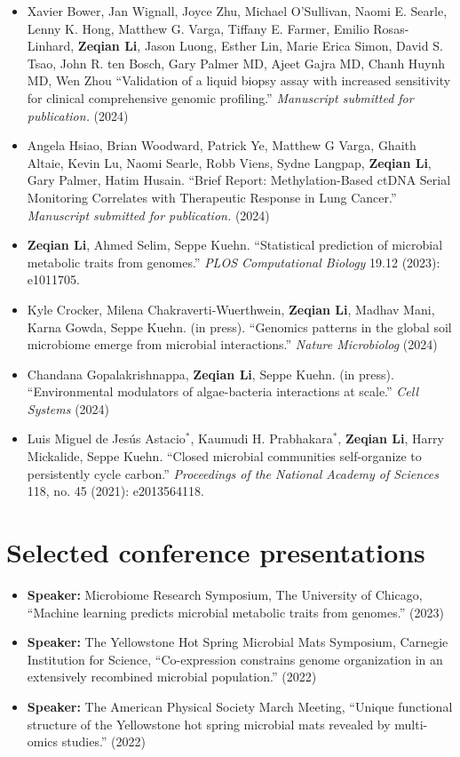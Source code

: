 \documentclass[letterpaper,11pt]{article}
\newcommand{\resumeSubHeadingListStart}{\begin{itemize}[leftmargin=0in]}
\newcommand{\resumeSubHeadingListEnd}{\end{itemize}}
\begin{document}
 \resumeSubHeadingListStart
     \item[] Xavier Bower, Jan Wignall, Joyce Zhu, Michael O’Sullivan, Naomi E. Searle, Lenny K. Hong, Matthew G. Varga, Tiffany E. Farmer, Emilio Rosas-Linhard, \textbf{Zeqian Li}, Jason Luong, Esther Lin, Marie Erica Simon, David S. Tsao, John R. ten Bosch, Gary Palmer MD, Ajeet Gajra MD, Chanh Huynh MD, Wen Zhou ``Validation of a liquid biopsy assay with increased sensitivity for clinical comprehensive genomic profiling.''  \textit{Manuscript submitted 
 for publication.} (2024)
     \item[] Angela Hsiao, Brian Woodward, Patrick Ye, Matthew G Varga, Ghaith Altaie, Kevin Lu, Naomi Searle, Robb Viens, Sydne Langpap, \textbf{Zeqian Li}, Gary Palmer, Hatim Husain. ``Brief Report: Methylation-Based ctDNA Serial Monitoring Correlates with Therapeutic Response in Lung Cancer.''  \textit{Manuscript submitted 
     for publication.} (2024)
     \item[] \textbf{Zeqian Li}, Ahmed Selim, Seppe Kuehn. ``Statistical prediction of microbial metabolic traits from genomes.''  \textit{PLOS Computational Biology} 19.12 (2023): e1011705.
     \item[] Kyle Crocker, Milena Chakraverti-Wuerthwein, \textbf{Zeqian Li}, Madhav Mani, Karna Gowda, Seppe Kuehn. (in press). ``Genomics patterns in the global soil microbiome emerge from microbial interactions.'' \textit{Nature Microbiolog} (2024)
     \item[] Chandana Gopalakrishnappa, \textbf{Zeqian Li}, Seppe Kuehn. (in press). ``Environmental modulators of algae-bacteria interactions at scale.'' \textit{Cell Systems} (2024)
     \item[] Luis Miguel de Jesús Astacio$^*$, Kaumudi H. Prabhakara$^*$, \textbf{Zeqian Li}, Harry Mickalide, Seppe Kuehn. ``Closed microbial communities self-organize to persistently cycle carbon.''  \textit{Proceedings of the National Academy of Sciences} 118, no. 45 (2021): e2013564118. 
 \resumeSubHeadingListEnd

\section{Selected conference presentations}
\resumeSubHeadingListStart
     \item[] \textbf{Speaker:} Microbiome Research Symposium, The University of Chicago, ``Machine learning predicts microbial metabolic traits from genomes.''  (2023)
     \item[] \textbf{Speaker:} The Yellowstone Hot Spring Microbial Mats Symposium, Carnegie Institution for Science, ``Co-expression constrains genome organization in an extensively recombined microbial population.''  (2022)
     \item[] \textbf{Speaker:} The American Physical Society March Meeting, ``Unique functional structure of the Yellowstone hot spring microbial mats revealed by multi-omics studies.''  (2022)

     
 \resumeSubHeadingListEnd



\end{document}
